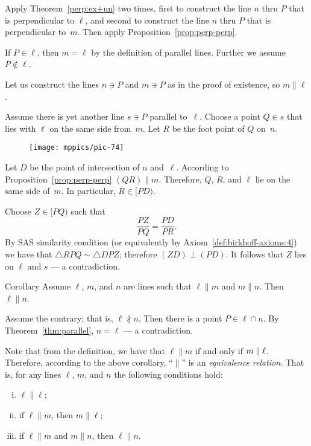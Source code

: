 Apply Theorem~\ref{perp:ex+un} two times,
first to construct the line $n$ thru $P$ that is perpendicular to $\ell$,
and second to construct the line $n$ thru $P$ that is perpendicular to~$m$.
Then apply Proposition~\ref{prop:perp-perp}.

If $P\in\ell$, then $m=\ell$ by the definition of parallel lines.
Further we assume $P\notin\ell$.

Let us construct the lines $n\ni P$ and $m\ni P$ as in the proof of existence, so $m\parallel \ell$.

Assume there is yet another line $s\ni P$ parallel to~$\ell$.
Choose a point $Q\in s$ that lies with $\ell$ on the same side from~$m$.
Let $R$ be the foot point of $Q$ on~$n$.

\begin{figure}[!ht]
\centering
\texttt{[image: mppics/pic-74]}
\end{figure}

Let $D$ be the point of intersection of $n$ and~$\ell$.
According to Proposition~\ref{prop:perp-perp} $(QR)\parallel m$. 
Therefore, $Q$, $R$, and $\ell$ lie on the same side of~$m$. 
In particular, $R\in [P D)$.

Choose $Z\in [P Q)$ such that 
$$\frac{PZ}{PQ}=\frac{PD}{PR}.$$
By SAS similarity condition (or equivalently by Axiom~\ref{def:birkhoff-axioms:4})
we have that $\triangle RPQ\sim \triangle DPZ$;
therefore $(Z D)\perp(P D)$.
It follows that $Z$ lies on $\ell$ and $s$ --- a contradiction.\qeds

\begin{thm}{Corollary}\label{cor:parallel-1}
Assume $\ell$, $m$, and $n$ are lines
such that $\ell\parallel m$ and $m\parallel n$.
Then $\ell\parallel n$.
\end{thm}

Assume the contrary; that is, $\ell\nparallel n$.
Then there is a point $P\in \ell\cap n$.
By Theorem~\ref{thm:parallel},
$n=\ell$ --- a contradiction.
\qeds

Note that from the definition, we have that $\ell\parallel m$ if and only if $m\z\parallel \ell$.
Therefore, according to the above corollary, ``$\parallel$'' is an 
\emph{equivalence relation}.
That is, for any lines $\ell$, $m$, and $n$ the following conditions hold:
\begin{enumerate}[(i)]
\item $\ell\parallel \ell$;
\item if $\ell\parallel m$, then $m\parallel \ell$;
\item if $\ell\parallel m$ and $m\parallel n$, then 
$\ell\parallel n$.
\end{enumerate}

